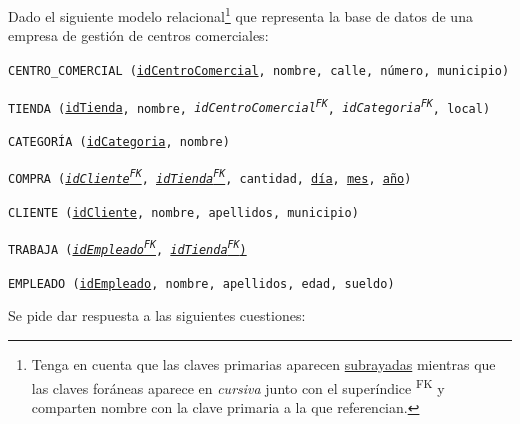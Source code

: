 \documentclass[12pt,a4paper,addpoints,answers]{exam}
\begin{document}
\begin{questions}
\newpage
\question Dado el siguiente modelo relacional\footnote{Tenga en cuenta que las claves primarias aparecen \underline{subrayadas} mientras que las claves foráneas aparece en \textit{cursiva} junto con el superíndice \textsuperscript{FK} y comparten nombre con la clave primaria a la que referencian.} que representa la base de datos de una empresa de gestión de centros comerciales:

\texttt{CENTRO\_COMERCIAL (\underline{idCentroComercial}, nombre, calle, número, municipio)}

\texttt{TIENDA (\underline{idTienda}, nombre, \textit{idCentroComercial\textsuperscript{FK}}, \textit{idCategoria\textsuperscript{FK}}, local)}

\texttt{CATEGORÍA (\underline{idCategoria}, nombre)}

\texttt{COMPRA (\underline{\textit{idCliente\textsuperscript{FK}}}, \underline{\textit{idTienda\textsuperscript{FK}}}, cantidad, \underline{día}, \underline{mes}, \underline{año})}

\texttt{CLIENTE (\underline{idCliente}, nombre, apellidos, municipio)}

\texttt{TRABAJA (\underline{\textit{idEmpleado\textsuperscript{FK}}}, \underline{\textit{idTienda\textsuperscript{FK}})}}

\texttt{EMPLEADO (\underline{idEmpleado}, nombre, apellidos, edad, sueldo)}

Se pide dar respuesta a las siguientes cuestiones:

\end{questions}
\end{document}

